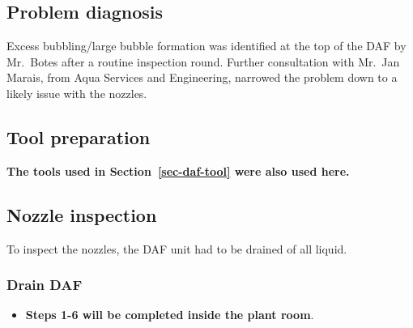 \documentclass[
  letterpaper,
  DIV=11,
  numbers=noendperiod]{scrreprt}
\providecommand{\tightlist}{%
  \setlength{\itemsep}{0pt}\setlength{\parskip}{0pt}}\usepackage{longtable,booktabs,array}
\begin{document}
\hypertarget{problem-diagnosis}{%
\subsection{Problem diagnosis}\label{problem-diagnosis}}

Excess bubbling/large bubble formation was identified at the top of the
DAF by Mr.~Botes after a routine inspection round. Further consultation
with Mr.~Jan Marais, from Aqua Services and Engineering, narrowed the
problem down to a likely issue with the nozzles.

\hypertarget{tool-preparation}{%
\subsection{Tool preparation}\label{tool-preparation}}

\textbf{The tools used in Section~\ref{sec-daf-tool} were also used
here.}

\hypertarget{nozzle-inspection}{%
\subsection{Nozzle inspection}\label{nozzle-inspection}}

To inspect the nozzles, the DAF unit had to be drained of all liquid.

\hypertarget{drain-daf-1}{%
\subsubsection{Drain DAF}\label{drain-daf-1}}

\begin{itemize}
\tightlist
\item
  \textbf{Steps 1-6 will be completed inside the plant room}.
\end{itemize}
\end{document}
